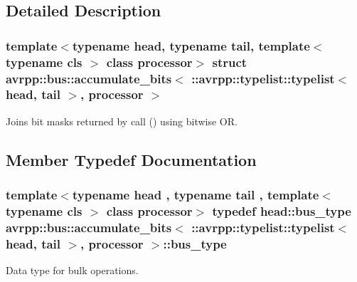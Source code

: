 \subsection{Detailed Description}
\subsubsection*{template$<$typename head, typename tail, template$<$ typename cls $>$ class processor$>$ struct avrpp::bus::accumulate\_\-bits$<$ ::avrpp::typelist::typelist$<$ head, tail $>$, processor $>$}

Joins bit masks returned by call () using bitwise OR. 

\subsection{Member Typedef Documentation}
\hypertarget{structavrpp_1_1bus_1_1accumulate__bits_3_01_1_1avrpp_1_1typelist_1_1typelist_3_01head_00_01tail_01_4_00_01processor_01_4_a363b6617b91b0231de3b4c22a8a68661}{
\subsubsection[{bus\_\-type}]{\setlength{\rightskip}{0pt plus 5cm}template$<$typename head , typename tail , template$<$ typename cls $>$ class processor$>$ typedef head::bus\_\-type avrpp::bus::accumulate\_\-bits$<$ ::{\bf avrpp::typelist::typelist}$<$ head, tail $>$, processor $>$::{\bf bus\_\-type}}}
\label{structavrpp_1_1bus_1_1accumulate__bits_3_01_1_1avrpp_1_1typelist_1_1typelist_3_01head_00_01tail_01_4_00_01processor_01_4_a363b6617b91b0231de3b4c22a8a68661}


Data type for bulk operations. 



